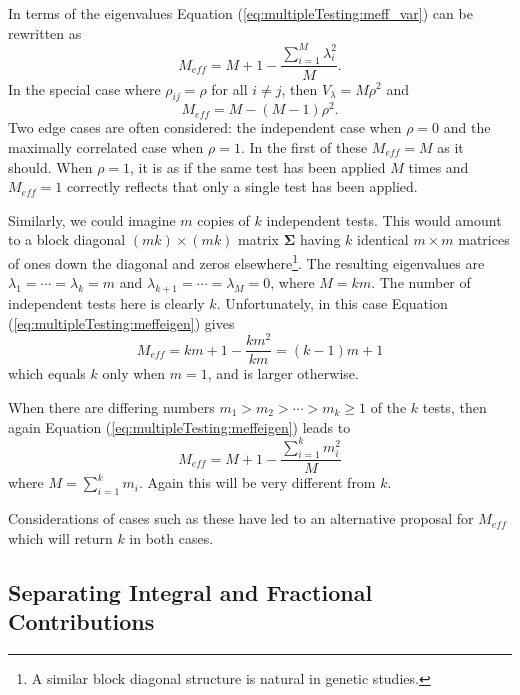 \documentclass[letterpaper,12pt,oneside,final]{article}
\newcommand{\sm}[1]{\boldsymbol{#1}}   %
\begin{document}
In terms of the eigenvalues Equation (\ref{eq:multipleTesting:meff_var}) can be rewritten as 
\begin{equation}
M_{eff} = M + 1 - \frac{\sum_{i=1}^M \lambda_i^2}{M}. %
\label{eq:multipleTesting:meffeigen}
\end{equation}
In the special case where $\rho_{ij} = \rho $ for all $i \ne j$, then $V_\lambda = M\rho^2$ and
\begin{equation}
M_{eff} = M - (M-1) \rho^2.
\label{eq:multipleTesting:meffeigenSpecialRho}
\end{equation}
Two edge cases are often considered: the independent case when $\rho = 0$ and the maximally correlated case when $\rho = 1$. In the first of these $M_{eff} = M$ as it should. When $\rho = 1$, it is as if the same test has been applied $M$ times and $M_{eff} = 1$ correctly reflects that only a single test has been applied.

Similarly, we could imagine $m$ copies of $k$ independent tests. This would amount to a block diagonal $(mk) \times (mk)$ matrix $\sm{\Sigma}$ having $k$ identical $m \times m$ matrices of ones down the diagonal and zeros elsewhere\footnote{A similar block diagonal structure is natural in genetic studies.}. The resulting eigenvalues are $\lambda_1 = \cdots = \lambda_k = m$ and $\lambda_{k+1} = \cdots = \lambda_M = 0$, where $M = km$.  The number of independent tests here is clearly $k$. Unfortunately, in this case Equation (\ref{eq:multipleTesting:meffeigen}) gives
\begin{equation}
M_{eff}  =  km + 1 - \frac{km^2}{km} = (k-1)m +1 
\label{eq:multipleTesting:Meff_varIndepTestCopies}
\end{equation}
which equals $k$ only when $m = 1$, and is larger otherwise.

When there are differing numbers $m_1 > m_2 > \cdots > m_k \ge1$ of the $k$ tests, then again Equation (\ref{eq:multipleTesting:meffeigen}) leads to 
\[
M_{eff}  =  M + 1 - \frac{\sum_{i = 1}^k m_i^2}{M}  
\]
where $M = \sum_{i = 1}^k m_i$.  Again this will be very different from $k$.

Considerations of cases such as these have led \cite{LiJi2005} to an alternative proposal for $M_{eff}$ which will return $k$ in both cases.

\subsection{Separating Integral and Fractional Contributions}
\end{document}
